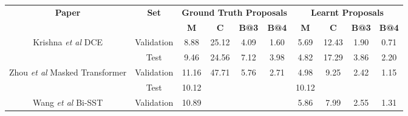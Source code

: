 \begin{table}[]
	\begin{tabular}{|c|c|cccc|cccc|}
		\hline
		\multirow{2}{*}{\textbf{Paper}}          & \multirow{2}{*}{\textbf{Set}} & \multicolumn{4}{c|}{\textbf{Ground Truth Proposals}}                                                                          & \multicolumn{4}{c|}{\textbf{Learnt Proposals}}                                                                       \\ \cline{3-10} 
		&                               & \multicolumn{1}{c|}{\textbf{M}} & \multicolumn{1}{c|}{\textbf{C}} & \multicolumn{1}{c|}{\textbf{B@3}} & \textbf{B@4}          & \multicolumn{1}{c|}{\textbf{M}} & \multicolumn{1}{c|}{\textbf{C}} & \multicolumn{1}{c|}{\textbf{B@3}} & \textbf{B@4} \\ \hline
		\multirow{2}{*}{Krishna \textit{et al} \cite{krishna2017densecaptioning} DCE}             & Validation                    & \multicolumn{1}{c|}{8.88}       & \multicolumn{1}{c|}{25.12}      & \multicolumn{1}{c|}{4.09}         & 1.60                  & \multicolumn{1}{c|}{5.69}       & \multicolumn{1}{c|}{12.43}      & \multicolumn{1}{c|}{1.90}         & 0.71         \\ \cline{2-10} 
		& Test                          & \multicolumn{1}{c|}{9.46}       & \multicolumn{1}{c|}{24.56}      & \multicolumn{1}{c|}{7.12}         & 3.98                  & \multicolumn{1}{c|}{4.82}       & \multicolumn{1}{c|}{17.29}      & \multicolumn{1}{c|}{3.86}         & 2.20         \\ \hline
		\multirow{2}{*}{Zhou \textit{et al} \cite{zhou2018end} Masked Transformer} & Validation                    & \multicolumn{1}{c|}{11.16}      & \multicolumn{1}{c|}{47.71}      & \multicolumn{1}{c|}{5.76}         & 2.71                  & \multicolumn{1}{c|}{4.98}       & \multicolumn{1}{c|}{9.25}       & \multicolumn{1}{c|}{2.42}         & 1.15         \\ \cline{2-10} 
		& Test                          & \multicolumn{1}{c|}{10.12}      & \multicolumn{1}{c|}{}           & \multicolumn{1}{l|}{}             & \multicolumn{1}{l|}{} & \multicolumn{1}{c|}{10.12}      & \multicolumn{1}{l|}{}           & \multicolumn{1}{c|}{}             &              \\ \hline
		\multirow{2}{*}{Wang \textit{et al} \cite{wang2018bidirectional} Bi-SST}             & Validation                    & \multicolumn{1}{c|}{10.89}      & \multicolumn{1}{c|}{}           & \multicolumn{1}{c|}{}             &                       & \multicolumn{1}{c|}{5.86}       & \multicolumn{1}{c|}{7.99}       & \multicolumn{1}{c|}{2.55}         & 1.31         \\ \cline{2-10} 

\end{tabular}
\end{table}
